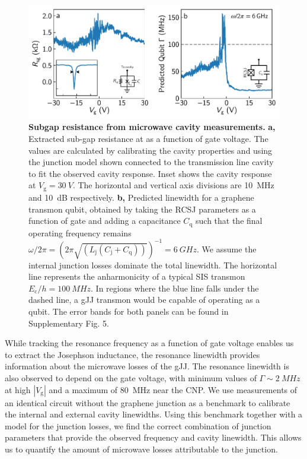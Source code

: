 \begin{figure}[thb]
	\centering
	\includegraphics[width=\linewidth]{chapter-gJJ/figs/fig4_final}
	\caption[]{\textbf{Subgap resistance from microwave cavity measurements.} 
		\textbf{a,}
		Extracted sub-gap resistance at as a function of gate voltage.
		The values are calculated by calibrating the cavity properties and using the junction model shown connected to the transmission line cavity to fit the observed cavity response.
		Inset shows the cavity response at $V_\text{g}=\SI{30}{V}$.
		The horizontal and vertical axis divisions are \SI{10}{MHz} and \SI{10}{dB} respectively.
		\textbf{b,}
		Predicted linewidth for a graphene transmon qubit, obtained by taking the RCSJ parameters as a function of gate and adding a capacitance $C_\text{q}$ such that the final operating frequency remains $\omega/2\pi = \left(2\pi\sqrt{(L_\text{j}(C_\text{j}+C_\text{q}))}\right)^{-1} = \SI{6}{GHz}$.
		We assume the internal junction losses dominate the total linewidth.
		The horizontal line represents the anharmonicity of a typical SIS transmon $E_\text{c}/h=\SI{100}{MHz}$.
		In regions where the blue line falls under the dashed line, a gJJ transmon would be capable of operating as a qubit.
		The error bands for both panels can be found in Supplementary Fig. 5.
	}
	\label{fig:figure4}
\end{figure}

While tracking the resonance frequency as a function of gate voltage enables us to extract the Josephson inductance, the resonance linewidth provides information about the microwave losses of the gJJ.
The resonance linewidth is also observed to depend on the gate voltage, with minimum values of $\Gamma\sim\SI{2}{MHz}$ at high $|V_\text{g}|$ and a maximum of \SI{80}{MHz} near the CNP.
We use measurements of an identical circuit without the graphene junction as a benchmark to calibrate the internal and external cavity linewidths.
Using this benchmark together with a model for the junction losses, we find the correct combination of junction parameters that provide the observed frequency and cavity linewidth.
This allows us to quantify the amount of microwave losses attributable to the junction.

